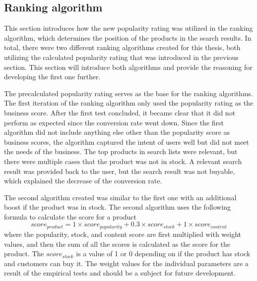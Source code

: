 

\subsection{Ranking algorithm}
\label{ss:methodsRanking}

This section introduces how the new popularity rating was utilized in the ranking algorithm,
which determines the position of the products in the search results.
In total, there were two different ranking algorithms created for this thesis, both utilizing the
calculated popularity rating that was introduced in the previous section.
This section will introduce both algorithms and provide the reasoning for developing the first
one further.


The precalculated popularity rating serves as the base for the ranking algorithms.
The first iteration of the ranking algorithm only used the popularity rating 
as the business score.
After the first test concluded, it became clear that it did not perform as expected
since the conversion rate went down.
Since the first algorithm did not include anything else other than the popularity score as business scores,
the algorithm captured the intent of users well but did not meet the needs of the business.
The top products in search lists were relevant, but there were multiple cases that the product 
was not in stock.
A relevant search result was provided back to the user, but the search result was not buyable, 
which explained the decrease of the conversion rate.


The second algorithm created was similar to the first one with an additional boost if the product was in stock.
The second algorithm uses the following formula to calculate the score for a product
\[ score_{product} = 1 \times score_{popularity} + 0.3 \times score_{stock} + 1 \times score_{content} \]
where the popularity, stock, and content score are first multiplied with weight values, and then 
the sum of all the scores is calculated as the score for the product.
The $score_{stock}$ is a value of 1 or 0 depending on if the product has stock and customers can buy it.
The weight values for the individual parameters are a result of the empirical tests and should be a subject
for future development.


